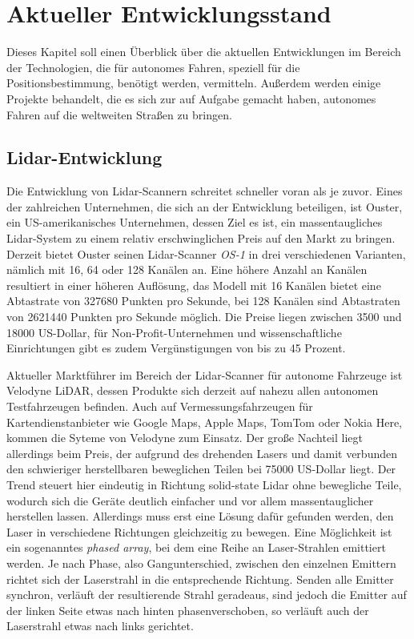 \chapter{Aktueller Entwicklungsstand}

Dieses Kapitel soll einen Überblick über die aktuellen Entwicklungen im Bereich der Technologien, die für autonomes Fahren, speziell für die Positionsbestimmung, benötigt werden, vermitteln. Außerdem werden einige Projekte behandelt, die es sich zur auf Aufgabe gemacht haben, autonomes Fahren auf die weltweiten Straßen zu bringen.


\section{\acs{Lidar}-Entwicklung}

Die Entwicklung von Lidar-Scannern schreitet schneller voran als je zuvor. Eines der zahlreichen Unternehmen, die sich an der Entwicklung beteiligen, ist Ouster, ein US-amerikanisches Unternehmen, dessen Ziel es ist, ein massentaugliches Lidar-System zu einem relativ erschwinglichen Preis auf den Markt zu bringen. Derzeit bietet Ouster seinen \acs{Lidar}-Scanner \emph{OS-1} in drei verschiedenen Varianten, nämlich mit 16, 64 oder 128 Kanälen an. Eine höhere Anzahl an Kanälen resultiert in einer höheren Auflösung, das Modell mit 16 Kanälen bietet eine Abtastrate von \num{327680} Punkten pro Sekunde, bei 128 Kanälen sind Abtastraten von \num{2621440} Punkten pro Sekunde möglich. Die Preise liegen zwischen \num{3500} und \num{18000} US-Dollar, für Non-Profit-Unternehmen und wissenschaftliche Einrichtungen gibt es zudem Vergünstigungen von bis zu 45 Prozent. 

Aktueller Marktführer im Bereich der \acs{Lidar}-Scanner für autonome Fahrzeuge ist Velodyne LiDAR, dessen Produkte sich derzeit auf nahezu allen autonomen Testfahrzeugen befinden. Auch auf Vermessungsfahrzeugen für Kartendienstanbieter wie Google Maps, Apple Maps, TomTom oder Nokia Here, kommen die Syteme von Velodyne zum Einsatz. Der große Nachteil liegt allerdings beim Preis, der aufgrund des drehenden Lasers und damit verbunden den schwieriger herstellbaren beweglichen Teilen bei \num{75000} US-Dollar liegt. Der Trend steuert hier eindeutig in Richtung solid-state Lidar ohne bewegliche Teile, wodurch sich die Geräte deutlich einfacher und vor allem massentauglicher herstellen lassen. Allerdings muss erst eine Lösung dafür gefunden werden, den Laser in verschiedene Richtungen gleichzeitig zu bewegen. Eine Möglichkeit ist ein sogenanntes \emph{phased array}, bei dem eine Reihe an Laser-Strahlen emittiert werden. Je nach Phase, also Gangunterschied, zwischen den einzelnen Emittern richtet sich der Laserstrahl in die entsprechende Richtung. Senden alle Emitter synchron, verläuft der resultierende Strahl geradeaus, sind jedoch die Emitter auf der linken Seite etwas nach hinten phasenverschoben, so verläuft auch der Laserstrahl etwas nach links gerichtet.


